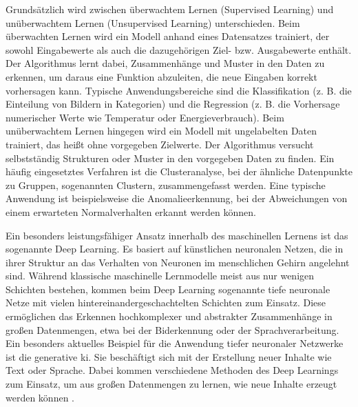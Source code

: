 Grundsätzlich wird zwischen überwachtem Lernen (Supervised Learning) und unüberwachtem Lernen (Unsupervised Learning) unterschieden.
Beim überwachten Lernen wird ein Modell anhand eines Datensatzes trainiert, der sowohl Eingabewerte als auch die dazugehörigen Ziel- bzw. Ausgabewerte enthält.
Der Algorithmus lernt dabei, Zusammenhänge und Muster in den Daten zu erkennen, um daraus eine Funktion abzuleiten, die neue Eingaben korrekt vorhersagen kann.
Typische Anwendungsbereiche sind die Klassifikation (z. B. die Einteilung von Bildern in Kategorien) und die Regression (z. B. die Vorhersage numerischer Werte wie Temperatur oder Energieverbrauch).
Beim unüberwachtem Lernen hingegen wird ein Modell mit ungelabelten Daten trainiert, das heißt ohne vorgegeben Zielwerte. 
Der Algorithmus versucht selbstständig Strukturen oder Muster in den vorgegeben Daten zu finden.
Ein häufig eingesetztes Verfahren ist die Clusteranalyse, bei der ähnliche Datenpunkte zu Gruppen, sogenannten Clustern, zusammengefasst werden. 
Eine typische Anwendung ist beispielsweise die Anomalieerkennung, bei der Abweichungen von einem erwarteten Normalverhalten erkannt werden können.

Ein besonders leistungsfähiger Ansatz innerhalb des maschinellen Lernens ist das sogenannte Deep Learning.
Es basiert auf künstlichen neuronalen Netzen, die in ihrer Struktur an das Verhalten von Neuronen im menschlichen Gehirn angelehnt sind.
Während klassische maschinelle Lernmodelle meist aus nur wenigen Schichten bestehen, kommen beim Deep Learning sogenannte tiefe neuronale Netze mit vielen hintereinandergeschachtelten Schichten zum Einsatz.
Diese ermöglichen das Erkennen hochkomplexer und abstrakter Zusammenhänge in großen Datenmengen, etwa bei der Biderkennung oder der Sprachverarbeitung. \cite{DLDefinition}
Ein besonders aktuelles Beispiel für die Anwendung tiefer neuronaler Netzwerke ist die generative \acs{ki}. 
Sie beschäftigt sich mit der Erstellung neuer Inhalte wie Text oder Sprache. 
Dabei kommen verschiedene Methoden des Deep Learnings zum Einsatz, um aus großen Datenmengen zu lernen, wie neue Inhalte erzeugt werden können \cite{GenerativeKI}.







